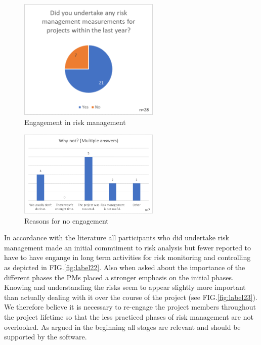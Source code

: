 \begin{figure}[H]
	\centering
	\includegraphics[width=0.6\textwidth]{Assets/survey_results/Q1.png}
	\caption{Engagement in risk management}
	\label{fig:label20}
\end{figure}
\begin{figure}[H]
	\centering
	\includegraphics[width=0.6\textwidth]{Assets/survey_results/Q2.png}
	\caption{Reasons for no engagement}
	\label{fig:label21}
\end{figure}

In accordance with the literature all participants who did undertake risk management made an initial commtiment to risk analysis but fewer reported to have to have engange in long term activities for risk monitoring and controlling as depicted in FIG.\ref{fig:label22}. Also when asked about the importance of the different phases the PMs placed a stronger emphasis on the initial phases. Knowing and understanding the risks seem to appear slightly more important than actually dealing with it over the course of the project (see FIG.\ref{fig:label23}).  We therefore believe it is necessary to re-engage the project members throughout the project lifetime so that the less practiced phases of risk management are not overlooked. As argued in the beginning all stages are relevant and should be supported by the software.
 
